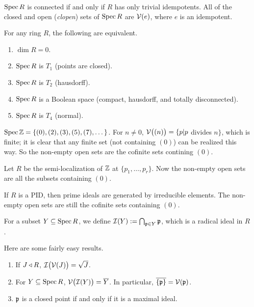  \setcounter{lecture}{19}

 $\operatorname{Spec} R$ is connected if and only if $R$ has only trivial idempotents. All of the
 closed and open (\emph{clopen}) sets of $\operatorname{Spec} R$ are $\mathcal{V}(e)$, where $e$ is an
 idempotent.

 \begin{proposition}
   For any ring $R$, the following are equivalent.
   \begin{enumerate}
     \item $\dim R=0$.
     \item $\operatorname{Spec} R$ is $T_1$ (points are closed).
     \item $\operatorname{Spec} R$ is $T_2$ (hausdorff).
     \item $\operatorname{Spec} R$ is a Boolean space (compact, hausdorff, and totally disconnected).
     \item $\operatorname{Spec} R$ is $T_4$ (normal).
   \end{enumerate}
 \end{proposition}
 \begin{example}
   $\operatorname{Spec} \mathbb{Z} = \{(0),(2),(3),(5),(7),\dots\}$. For $n\neq 0$, $\mathcal{V}\bigl((n)\bigr) = \{p|
   p$ divides $n\}$, which is finite; it is clear that any finite set (not containing
   $(0)$) can be realized this way. So the non-empty open sets are the cofinite sets
   contining $(0)$.
 \end{example}
 \begin{example}
   Let $R$ be the semi-localization of $\mathbb{Z}$ at $\{p_1,\dots, p_r\}$. Now the non-empty
   open sets are all the subsets containing $(0)$.
 \end{example}
 \begin{example}
   If $R$ is a PID, then prime ideals are generated by irreducible elements. The
   non-empty open sets are still the cofinite sets containing $(0)$.
 \end{example}
 \begin{definition}
   For a subset $Y\subseteq \operatorname{Spec} R$, we define $\mathcal{I}(Y):=\bigcap_{\mathfrak{p}\in Y}\mathfrak{p}$, which is a
   radical ideal in $R$.
 \end{definition}
 \begin{proposition}
   Here are some fairly easy results.
   \begin{enumerate}
     \item If $J\triangleleft R$, $\mathcal{I}\bigl(\mathcal{V}(J)\bigr) = \sqrt J$.
     \item For $Y\subseteq \operatorname{Spec} R$, $\mathcal{V}\bigl(\mathcal{I}(Y)\bigr)=\overline{Y}$. In particular,
     $\overline{\{\mathfrak{p}\}}=\mathcal{V}(\mathfrak{p})$.
     \item $\mathfrak{p}$ is a closed point if and only if it is a maximal ideal.
   \end{enumerate}
 \end{proposition}
